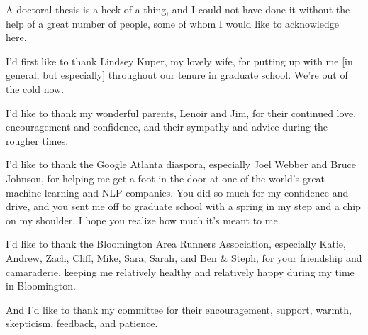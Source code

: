 
A doctoral thesis is a heck of a thing, and I could not have done it without
the help of a great number of people, some of whom I would like to acknowledge
here.

I'd first like to thank Lindsey Kuper, my lovely wife, for putting up with me
[in general, but especially]
throughout our tenure in graduate school. We're out of the cold now.

I'd like to thank my wonderful parents, Lenoir and Jim, for their continued
love, encouragement and confidence, and their sympathy and advice during the
rougher times.

I'd like to thank the Google Atlanta diaspora, especially Joel Webber and Bruce
Johnson, for helping me get a foot in the door at one of the world's great
machine learning and NLP companies. You did so much for my confidence and
drive, and you sent me off to graduate school with a spring in my step and a
chip on my shoulder. I hope you realize how much it's meant to me.

I'd like to thank the Bloomington Area Runners Association, especially Katie,
Andrew, Zach, Cliff, Mike, Sara, Sarah, and Ben \& Steph, for your friendship
and camaraderie, keeping me relatively healthy and relatively happy during my
time in Bloomington.

And I'd like to thank my committee for their encouragement, support, warmth,
skepticism, feedback, and patience.
